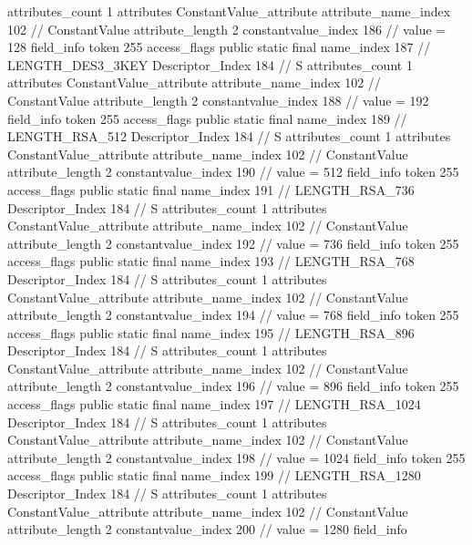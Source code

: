 {{{{{				attributes_count	1
				attributes {
				ConstantValue_attribute {
					attribute_name_index	102		// ConstantValue
					attribute_length	2
					constantvalue_index	186		// value = 128
				}
				}
			}
			field_info {
				token	255
				access_flags	public static final
				name_index	187		// LENGTH_DES3_3KEY
				Descriptor_Index	184		// S
				attributes_count	1
				attributes {
				ConstantValue_attribute {
					attribute_name_index	102		// ConstantValue
					attribute_length	2
					constantvalue_index	188		// value = 192
				}
				}
			}
			field_info {
				token	255
				access_flags	public static final
				name_index	189		// LENGTH_RSA_512
				Descriptor_Index	184		// S
				attributes_count	1
				attributes {
				ConstantValue_attribute {
					attribute_name_index	102		// ConstantValue
					attribute_length	2
					constantvalue_index	190		// value = 512
				}
				}
			}
			field_info {
				token	255
				access_flags	public static final
				name_index	191		// LENGTH_RSA_736
				Descriptor_Index	184		// S
				attributes_count	1
				attributes {
				ConstantValue_attribute {
					attribute_name_index	102		// ConstantValue
					attribute_length	2
					constantvalue_index	192		// value = 736
				}
				}
			}
			field_info {
				token	255
				access_flags	public static final
				name_index	193		// LENGTH_RSA_768
				Descriptor_Index	184		// S
				attributes_count	1
				attributes {
				ConstantValue_attribute {
					attribute_name_index	102		// ConstantValue
					attribute_length	2
					constantvalue_index	194		// value = 768
				}
				}
			}
			field_info {
				token	255
				access_flags	public static final
				name_index	195		// LENGTH_RSA_896
				Descriptor_Index	184		// S
				attributes_count	1
				attributes {
				ConstantValue_attribute {
					attribute_name_index	102		// ConstantValue
					attribute_length	2
					constantvalue_index	196		// value = 896
				}
				}
			}
			field_info {
				token	255
				access_flags	public static final
				name_index	197		// LENGTH_RSA_1024
				Descriptor_Index	184		// S
				attributes_count	1
				attributes {
				ConstantValue_attribute {
					attribute_name_index	102		// ConstantValue
					attribute_length	2
					constantvalue_index	198		// value = 1024
				}
				}
			}
			field_info {
				token	255
				access_flags	public static final
				name_index	199		// LENGTH_RSA_1280
				Descriptor_Index	184		// S
				attributes_count	1
				attributes {
				ConstantValue_attribute {
					attribute_name_index	102		// ConstantValue
					attribute_length	2
					constantvalue_index	200		// value = 1280
				}
				}
			}
			field_info {
}}}}}
